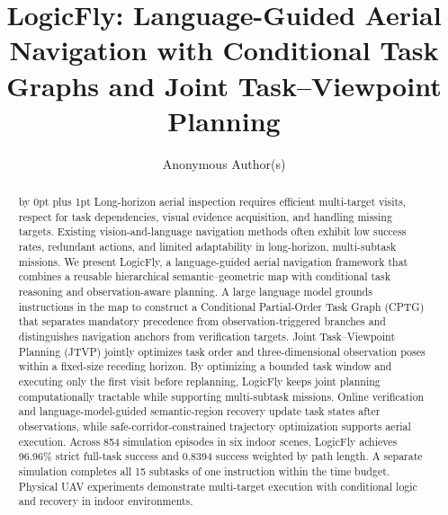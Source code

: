 \documentclass[letterpaper,10pt,journal]{IEEEtran}
\title{LogicFly: Language-Guided Aerial Navigation with Conditional Task Graphs and Joint Task--Viewpoint Planning}
\author{Anonymous Author(s)}
\begin{document}
\maketitle
\begingroup
\setlength{\parskip}{0pt}
\begin{abstract}
\advance\baselineskip by 0pt plus 1pt\relax
Long-horizon aerial inspection requires efficient multi-target visits, respect for task dependencies, visual evidence acquisition, and handling missing targets. Existing vision-and-language navigation methods often exhibit low success rates, redundant actions, and limited adaptability in long-horizon, multi-subtask missions. We present LogicFly, a language-guided aerial navigation framework that combines a reusable hierarchical semantic--geometric map with conditional task reasoning and observation-aware planning. A large language model grounds instructions in the map to construct a Conditional Partial-Order Task Graph (CPTG) that separates mandatory precedence from observation-triggered branches and distinguishes navigation anchors from verification targets. Joint Task--Viewpoint Planning (JTVP) jointly optimizes task order and three-dimensional observation poses within a fixed-size receding horizon. By optimizing a bounded task window and executing only the first visit before replanning, LogicFly keeps joint planning computationally tractable while supporting multi-subtask missions. Online verification and language-model-guided semantic-region recovery update task states after observations, while safe-corridor-constrained trajectory optimization supports aerial execution. Across 854 simulation episodes in six indoor scenes, LogicFly achieves 96.96\% strict full-task success and 0.8394 success weighted by path length. A separate simulation completes all 15 subtasks of one instruction within the time budget. Physical UAV experiments demonstrate multi-target execution with conditional logic and recovery in indoor environments.
\end{abstract}
\end{document}
